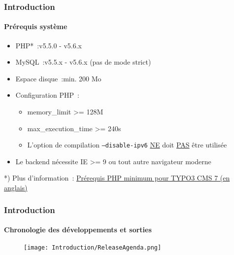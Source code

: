 \begin{frame}[fragile]
	\frametitle{Introduction}
	\framesubtitle{Prérequis système}

	\begin{itemize}
		\item PHP*~:\tabto{3cm}v5.5.0 - v5.6.x
		\item MySQL~:\tabto{3cm}v5.5.x - v5.6.x (pas de mode strict)
		\item Espace disque~:\tabto{3cm}min. 200 Mo
		\item Configuration PHP~:

			\begin{itemize}
				\item memory\_limit >= 128M
				\item max\_execution\_time >= 240s
				\item L'option de compilation \texttt{--disable-ipv6} \underline{NE} doit \underline{PAS} être utilisée
			\end{itemize}

		\item Le backend nécessite IE >= 9 ou tout autre navigateur moderne

	\end{itemize}

	\vspace{.8cm}
	*) Plus d'information~: \href{http://typo3.org/news/article/php-minimum-requirements-for-typo3-cms-7/}{Prérequis PHP minimum pour TYPO3 CMS 7 (en anglais)}

\end{frame}

\begin{frame}[fragile]
	\frametitle{Introduction}
	\framesubtitle{Chronologie des développements et sorties}

	\begin{figure}
		\texttt{[image: Introduction/ReleaseAgenda.png]}
	\end{figure}

\end{frame}

